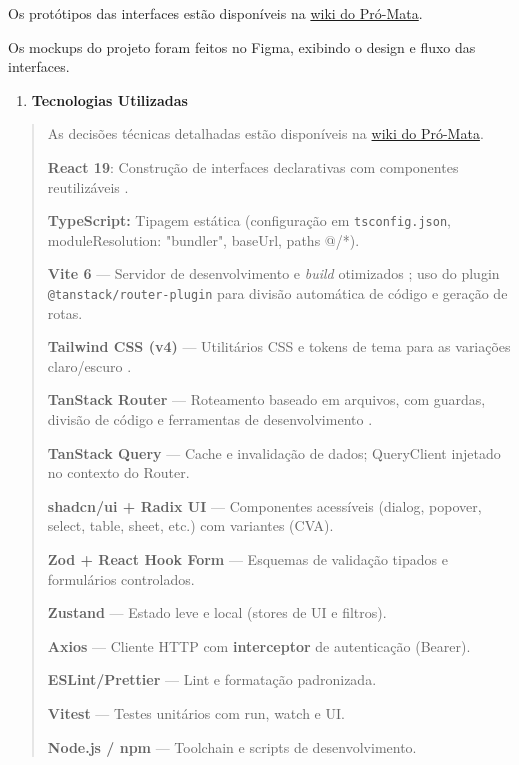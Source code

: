 Os protótipos das interfaces estão disponíveis na
\href{https://tools.ages.pucrs.br/pro-mata/wiki/-/wikis/Design}{wiki do Pró-Mata}.

Os mockups do projeto foram feitos no Figma, exibindo o design e fluxo
das interfaces.

\begin{enumerate}
\def\labelenumi{\arabic{enumi}.}
\setcounter{enumi}{4}
\item
  \textbf{Tecnologias Utilizadas}
\end{enumerate}

\begin{quote}
As decisões técnicas detalhadas estão disponíveis na
\href{https://tools.ages.pucrs.br/pro-mata/wiki/-/wikis/Arquitetura}{wiki do Pró-Mata}.

\textbf{React 19}: Construção de interfaces declarativas com componentes
reutilizáveis \cite{react}.

\textbf{TypeScript:} Tipagem estática (configuração em \texttt{tsconfig.json},
moduleResolution: "bundler", baseUrl, paths @/*).

\textbf{Vite 6} --- Servidor de desenvolvimento e \textit{build} otimizados
\cite{vite}; uso do plugin \texttt{@tanstack/router-plugin} para divisão
automática de código e geração de rotas.

\textbf{Tailwind CSS (v4)} --- Utilitários CSS e tokens de tema para as
variações claro/escuro \cite{tailwind}.

\textbf{TanStack Router} --- Roteamento baseado em arquivos, com guardas,
divisão de código e ferramentas de desenvolvimento \cite{tanstack-router}.

\textbf{TanStack Query} --- Cache e invalidação de dados; QueryClient
injetado no contexto do Router.

\textbf{shadcn/ui + Radix UI} --- Componentes acessíveis (dialog,
popover, select, table, sheet, etc.) com variantes (CVA).

\textbf{Zod + React Hook Form} --- Esquemas de validação tipados e
formulários controlados.

\textbf{Zustand} --- Estado leve e local (stores de UI e filtros).

\textbf{Axios} --- Cliente HTTP com \textbf{interceptor} de autenticação
(Bearer).

\textbf{ESLint/Prettier} --- Lint e formatação padronizada.

\textbf{Vitest} --- Testes unitários com run, watch e UI.

\textbf{Node.js / npm} --- Toolchain e scripts de desenvolvimento.
\end{quote}

